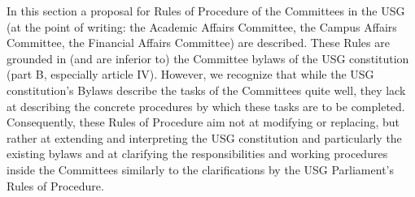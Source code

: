 In this section a proposal for Rules of Procedure of the Committees in the USG (at the point of writing: the Academic Affairs Committee, the Campus Affairs Committee, the Financial Affairs Committee) are described. These Rules are grounded in (and are inferior to) the Committee bylaws of the USG constitution (part B, especially article IV). However, we recognize that while the USG constitution's Bylaws describe the tasks of the Committees quite well, they lack at describing the concrete procedures by which these tasks are to be completed. Consequently, these Rules of Procedure aim not at modifying or replacing, but rather at extending and interpreting the USG constitution and particularly the existing bylaws and at clarifying the responsibilities and working procedures inside the Committees similarly to the clarifications by the USG Parliament's Rules of Procedure.